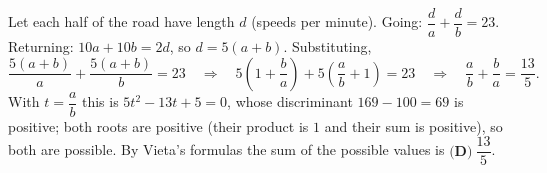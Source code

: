 Let each half of the road have length $d$ (speeds per minute). Going: $\dfrac {d}{a}+\dfrac {d}{b}=23$. Returning: $10a+10b=2d$, so $d=5(a+b)$. Substituting,
\[
\dfrac{5(a+b)}{a}+\dfrac{5(a+b)}{b}=23\quad\Longrightarrow\quad 5\left(1+\dfrac {b}{a}\right)+5\left(\dfrac {a}{b}+1\right)=23\quad\Longrightarrow\quad \dfrac {a}{b}+\dfrac {b}{a}=\dfrac{13}{5}.
\]
With $t=\dfrac {a}{b}$ this is $5t^2-13t+5=0$, whose discriminant $169-100=69$ is positive; both roots are positive (their product is $1$ and their sum is positive), so both are possible. By Vieta's formulas the sum of the possible values is $\boxed{\textbf{(D)}\ \dfrac{13}{5}}$.
